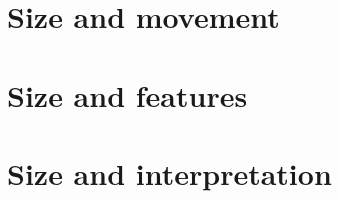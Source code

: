 \documentclass[output=book,
               collection,
               multiauthors,
              ]{langscibook}
\begin{document}
\maketitle
\frontmatter

{\sloppy\tableofcontents}




\mainmatter


\part{Size and movement}

\part{Size and features}

\part{Size and interpretation}


\end{document}
